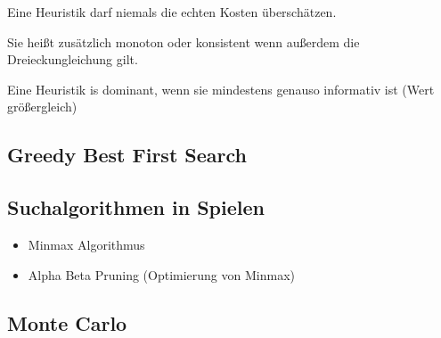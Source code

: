 \documentclass[a4paper]{article}
\begin{document}
Eine Heuristik darf niemals die echten Kosten überschätzen.

Sie heißt zusätzlich monoton oder konsistent wenn außerdem die Dreieckungleichung gilt.

Eine Heuristik is dominant, wenn sie mindestens genauso informativ ist (Wert größergleich)

\subsection{Greedy Best First Search}


\subsection{Suchalgorithmen in Spielen}

\begin{itemize}
    \item Minmax Algorithmus
    \item Alpha Beta Pruning (Optimierung von Minmax)
\end{itemize}


\subsection{Monte Carlo}

\end{document}
